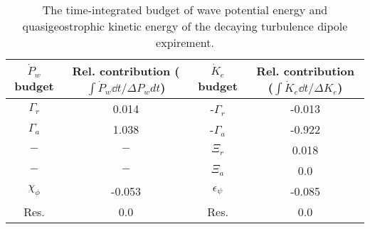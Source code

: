 \begin{table}
\begin{center}
\caption{The time-integrated budget of wave potential energy and quasigeostrophic                kinetic energy of the decaying turbulence dipole expirement. \label{table2}}
\begin{tabular}{cccc}
    \hline
$\dot{P}_w$ budget & Rel. contribution ($\int\dot{P}_w \dd t/\Delta P_w dt$) & $\dot{K}_e$ budget & Rel. contribution ($\int\dot{K}_e \dd t/\Delta K_e$)\\
 \hline
$\Gamma_r$ & 0.014 & -$\Gamma_r$ & -0.013 \\
$\Gamma_a$ & 1.038 & -$\Gamma_a$ & -0.922 \\
$-$ & $-$ & $\Xi_r$ & 0.018 \\
$-$ & $-$ & $\Xi_a$ & 0.0 \\
$\chi_\phi$ & -0.053 & $\epsilon_\psi$ & -0.085 \\
Res. & 0.0 & Res. & 0.0 \\
\end{tabular}
\end{center}
\end{table}
